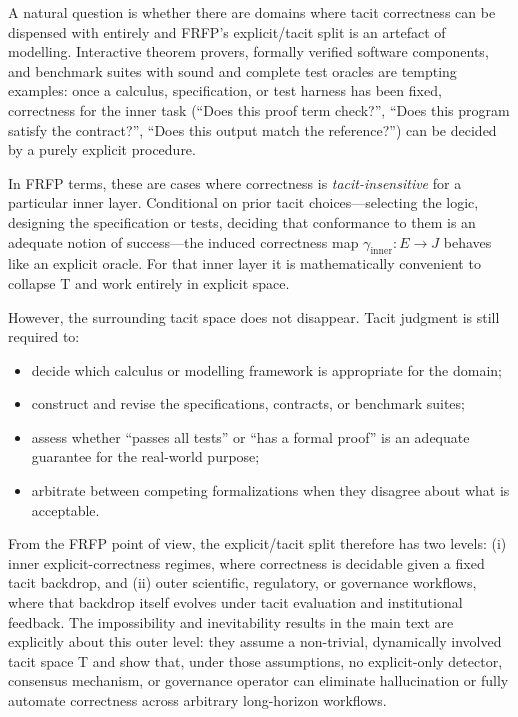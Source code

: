 A natural question is whether there are domains where tacit correctness can be dispensed with entirely and
FRFP’s explicit/tacit split is an artefact of modelling.
Interactive theorem provers, formally verified software components, and benchmark suites with sound and complete
test oracles are tempting examples: once a calculus, specification, or test harness has been fixed, correctness for
the inner task (“Does this proof term check?”, “Does this program satisfy the contract?”, “Does this output match
the reference?”) can be decided by a purely explicit procedure.

In FRFP terms, these are cases where correctness is \emph{tacit-insensitive} for a particular inner layer.
Conditional on prior tacit choices—selecting the logic, designing the specification or tests, deciding that conformance
to them is an adequate notion of success—the induced correctness map
\(\gamma_{\mathrm{inner}} : E \to J\) behaves like an explicit oracle.
For that inner layer it is mathematically convenient to collapse T and work entirely in explicit space.

However, the surrounding tacit space does not disappear.
Tacit judgment is still required to:
\begin{itemize}
  \item decide which calculus or modelling framework is appropriate for the domain;
  \item construct and revise the specifications, contracts, or benchmark suites;
  \item assess whether “passes all tests” or “has a formal proof” is an adequate guarantee for the real-world purpose;
  \item arbitrate between competing formalizations when they disagree about what is acceptable.
\end{itemize}

From the FRFP point of view, the explicit/tacit split therefore has two levels:
(i) inner explicit-correctness regimes, where correctness is decidable given a fixed tacit backdrop,
and (ii) outer scientific, regulatory, or governance workflows, where that backdrop itself evolves under
tacit evaluation and institutional feedback.
The impossibility and inevitability results in the main text are explicitly about this outer level:
they assume a non-trivial, dynamically involved tacit space T and show that, under those assumptions,
no explicit-only detector, consensus mechanism, or governance operator can eliminate hallucination or fully automate
correctness across arbitrary long-horizon workflows.

